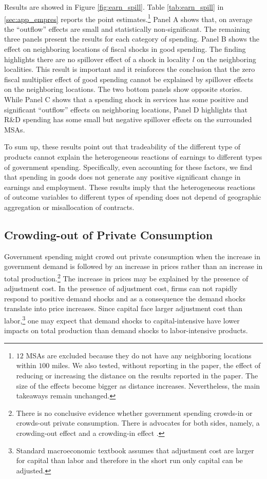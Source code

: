 \documentclass[dv_diss_main.tex]{subfiles}
\begin{document}
Results are showed in Figure \ref{fig:earn_spill}. Table \ref{tab:earn_spill} in \ref{sec:app_empres} reports the point estimates.\footnote{$12$ MSAs are excluded because they do not have any neighboring locations within $100$ miles. We also tested, without reporting in the paper, the effect of reducing or increasing the distance on the results reported in the paper. The size of the effects become bigger as distance increases. Nevertheless, the main takeaways remain unchanged.} Panel A shows that, on average the ``outflow'' effects are small and statistically non-significant. The remaining three panels present the results for each category of spending. Panel B shows the effect on neighboring locations of fiscal shocks in good spending. The finding highlights there are no spillover effect of a shock in locality $l$ on the neighboring localities. This result is important and it reinforces the conclusion that the zero fiscal multiplier effect of good spending cannot be explained by spillover effects on the neighboring locations. The two bottom panels show opposite stories. While Panel C shows that a spending shock in services has some positive and significant ``outflow'' effects on neighboring locations, Panel D highlights that R\&D spending has some small but negative spillover effects on the surrounded MSAs.
 
To sum up, these results point out that tradeability of the different type of products cannot explain the heterogeneous reactions of earnings to different types of government spending. Specifically, even accounting for these factors, we find that spending in goods does not generate any positive significant change in earnings and employment. These results imply that the heterogeneous reactions of outcome variables to different types of spending does not depend of geographic aggregation or misallocation of contracts.


\subsection{Crowding-out of Private Consumption}
\label{subsec:crowd}


Government spending might crowd out private consumption when the increase in government demand is followed by an increase in prices rather than an increase in total production.\footnote{There is no conclusive evidence whether government spending crowds-in or crowds-out private consumption. There is advocates for both sides, namely, a crowding-out effect \citep{Bailey1971, Barro1981} and a crowding-in effect \citep{Perotti2005, Canzoneri2002, Mountford2009}.} The increase in prices may be explained by the presence of adjustment cost. In the presence of adjustment cost, firms can not rapidly respond to positive demand shocks and as a consequence the demand shocks translate into price increases. Since capital face larger adjustment cost than labor,\footnote{Standard macroeconomic textbook assumes that adjustment cost are larger for capital than labor and therefore in the short run only capital can be adjusted.} one may expect that demand shocks to capital-intensive have lower impacts on total production than demand shocks to labor-intensive products.   
\end{document}
